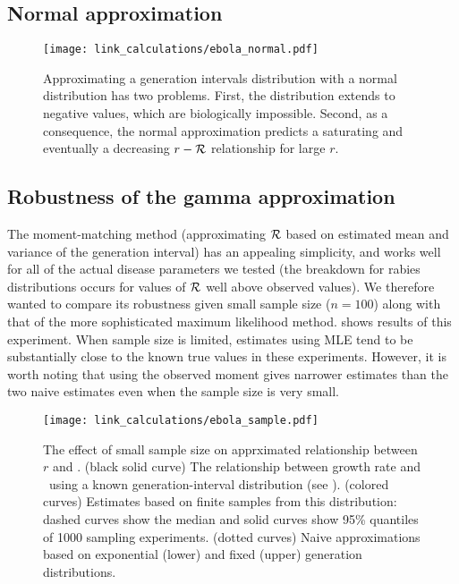 

\subsection{Normal approximation}

\begin{figure}[htbp] \centering
	\texttt{[image: link\_calculations/ebola\_normal.pdf]}
\caption{
Approximating a generation intervals distribution with a normal distribution has two problems. First, the distribution extends to negative values, which are biologically impossible. Second, as a consequence, the normal approximation predicts a saturating and eventually a decreasing $r-{\cal R}$ relationship for large $r$.
}
	\label{fig:ebolaNormal}
\end{figure}

\subsection{Robustness of the gamma approximation}

The moment-matching method (approximating ${\cal R}$ based on estimated mean and variance of the generation interval) has an appealing simplicity, and works well for all of the actual disease parameters we tested (the breakdown for rabies distributions occurs for values of ${\cal R}$ well above observed values). We therefore wanted to compare its robustness given small sample size ($n=100$) along with that of the more sophisticated maximum likelihood method.  shows results of this experiment. When sample size is limited, estimates using MLE tend to be substantially close to the known true values in these experiments. However, it is worth noting that using the observed moment gives narrower estimates than the two naive estimates even when the sample size is very small.

\begin{figure}[htbp] \centering
	\texttt{[image: link\_calculations/ebola\_sample.pdf]}
\caption{
%
The effect of small sample size on apprximated relationship between $r$ and \RR.
(black solid curve) The relationship between growth rate and \RR~using a known generation-interval distribution (see ).
(colored curves) Estimates based on finite samples from this distribution: dashed curves show the median and solid curves show 95\% quantiles of 1000 sampling experiments.
(dotted curves) Naive approximations based on exponential (lower) and fixed (upper) generation distributions.
%
}
	\label{fig:ebolaSample}
\end{figure}




